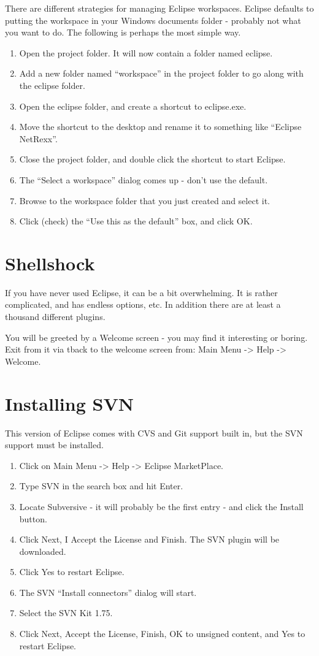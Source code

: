 There are different strategies for managing Eclipse workspaces.
Eclipse defaults to putting the workspace in your Windows documents
folder - probably not what you want to do.  The following is perhaps
the most simple way.
\begin{enumerate}
\item Open the project folder.  It will now contain a folder named
   eclipse.
\item Add a new folder named ``workspace'' in the project folder to go
along with the eclipse folder.
\item Open the eclipse folder, and create a shortcut to eclipse.exe.
\item Move the shortcut to the desktop and rename it to something like
   ``Eclipse NetRexx''.
\item Close the project folder, and double click the shortcut to start
   Eclipse.
\item The ``Select a workspace'' dialog comes up - don't use the default.
\item Browse to the workspace folder that you just created and select it.
\item Click (check) the ``Use this as the default'' box, and click OK.
\end{enumerate}
\section{Shellshock}
 
If you have never used Eclipse, it can be a bit overwhelming.  It is
rather complicated, and has endless options, etc.  In addition there
are at least a thousand different plugins.
 
You will be greeted by a Welcome screen - you may find it interesting
or boring.  Exit from it via tback to the welcome screen from: Main Menu -> Help -> Welcome.
 
\section{Installing SVN}
 
This version of Eclipse comes with CVS and Git support built in, but
the SVN support must be installed.
\begin{enumerate}
\item Click on Main Menu -> Help -> Eclipse MarketPlace.
\item Type SVN in the search box and hit Enter.
\item Locate Subversive - it will probably be the first entry - and click
the Install button.
\item Click Next, I Accept the License and Finish.  The SVN plugin will
be downloaded.
\item Click Yes to restart Eclipse.
\item The SVN ``Install connectors'' dialog will start.
\item Select the SVN Kit 1.75.
\item Click Next, Accept the License, Finish, OK to unsigned content, and
   Yes to restart Eclipse.
\end{enumerate} 
